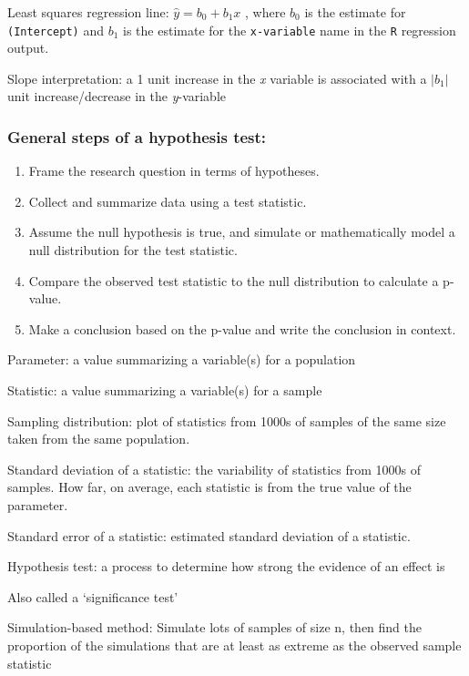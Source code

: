 \documentclass[
]{report}
\newcommand{\rgi}{\hspace{24pt}}  %
\begin{document}
Least squares regression line: \(\hat{y} = b_0+b_1x\) , where \(b_0\) is the estimate for \texttt{(Intercept)} and \(b_1\) is the estimate for the \texttt{x-variable} name in the \texttt{R} regression output.

Slope interpretation: a 1 unit increase in the \emph{x} variable is associated with a \(|b_1 |\) unit increase/decrease in the \emph{y}-variable

\hypertarget{general-steps-of-a-hypothesis-test-4}{%
\subsubsection*{General steps of a hypothesis test:}\label{general-steps-of-a-hypothesis-test-4}}

\begin{enumerate}
\def\labelenumi{\arabic{enumi}.}
\item
  Frame the research question in terms of hypotheses.
\item
  Collect and summarize data using a test statistic.
\item
  Assume the null hypothesis is true, and simulate or mathematically model a null distribution for the test statistic.
\item
  Compare the observed test statistic to the null distribution to calculate a p-value.
\item
  Make a conclusion based on the p-value and write the conclusion in context.
\end{enumerate}

Parameter: a value summarizing a variable(s) for a population

Statistic: a value summarizing a variable(s) for a sample

Sampling distribution: plot of statistics from 1000s of samples of the same size taken from the same population.

Standard deviation of a statistic: the variability of statistics from 1000s of samples. How far, on average, each statistic is from the true value of the parameter.

Standard error of a statistic: estimated standard deviation of a statistic.

Hypothesis test: a process to determine how strong the evidence of an effect is

\rgi Also called a `significance test'

Simulation-based method: Simulate lots of samples of size n, then find the proportion of the simulations that are at least as extreme as the observed sample statistic
\end{document}
